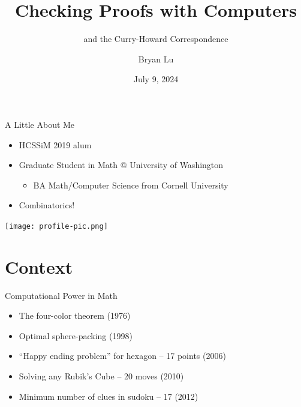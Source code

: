 \documentclass{beamer}
\title{Checking Proofs with Computers}
\subtitle{and the Curry-Howard Correspondence}
\author{Bryan Lu}
\date{July 9, 2024}
\begin{document}
  

	\setcounter{showProgressBar}{0}
	\setcounter{showSlideNumbers}{0}

\frame{\titlepage}

\begin{frame}{A Little About Me}
  \begin{minipage}{0.6\textwidth}
  \begin{itemize}
    \item HCSSiM 2019 alum
    \item Graduate Student in Math @ University of Washington
      \begin{itemize}
        \item BA Math/Computer Science from Cornell University 
      \end{itemize}
    \item Combinatorics! 
  \end{itemize}  
  \end{minipage}
  \hfill
  \begin{minipage}{0.3\textwidth}
    \texttt{[image: profile-pic.png]} 
  \end{minipage}
\end{frame}

\section{Context}

  \setcounter{framenumber}{0}
	\setcounter{showProgressBar}{1}
	\setcounter{showSlideNumbers}{1}


\begin{frame}{Computational Power in Math}
  \pause
  \begin{itemize}
    \item The four-color theorem (1976)
    \item Optimal sphere-packing (1998)
    \pause\item ``Happy ending problem'' for hexagon -- 17 points (2006)
    \item Solving any Rubik's Cube -- 20 moves (2010)
    \item Minimum number of clues in sudoku -- 17 (2012)
  \end{itemize} 
\end{frame}
\end{document}
